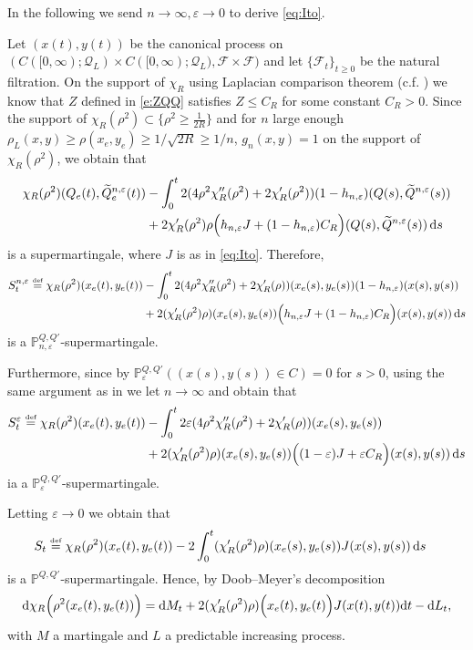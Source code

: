 \documentclass[11pt,UTF-8,reqno]{amsart}
\numberwithin{equation}{section}
\def\eps{\varepsilon}
\def\dif{{\mathord{{\rm d}}}}
\newcommand{\eqdef}{\stackrel{\mbox{\tiny def}}{=}}
\def\cQ{{\mathcal Q}}
\def\mP{{\mathbb P}}
\def\sF{{\mathscr F}}
\def\geq{\geqslant}
\def\leq{\leqslant}
\def\eps{\varepsilon}
\def\dif{{\mathord{{\rm d}}}}
\def\geq{\geqslant}
\def\leq{\leqslant}
\begin{document}
In the following we send $n\to\infty, \eps\to 0$ to derive \eqref{eq:Ito}.

Let $(x(t),y(t))$ be the canonical process on $(C([0,\infty);\cQ_L)\times C([0,\infty);\cQ_L),\sF\times \sF)$ and let $\{\sF_t\}_{t\geq0}$ be the natural filtration. On the support of $\chi_R$ using Laplacian comparison theorem (c.f. \cite[Corollary 3.4.4]{Hsu}) we know that $Z$ defined in  \eqref{e:ZQQ}  satisfies $Z\leq C_R$ for some constant $C_R>0$.
Since the support of $\chi_R(\rho^2)\subset \{\rho^2\geq \frac1{2R}\}$ and  for $n$ large enough  $\rho_L(x,y)\geq \rho(x_e,y_e) \geq 1/\sqrt{2R}\geq 1/n$, $g_n(x,y)=1$  on the support of $\chi_R(\rho^2)$, we obtain that
\begin{equation*}
	\aligned
	\chi_R(\rho^2)(Q_e(t),\widetilde{Q}^{n,\eps}_e(t))&-\int_0^t2(4\rho^2\chi_R''(\rho^2)+2\chi_R'(\rho^2))(1-h_{n,\eps})(Q(s),\widetilde{Q}^{n,\eps}(s))
	\\&+2\chi_R'(\rho^2)\rho\Big( h_{n,\eps}J+(1-h_{n,\eps})C_R\Big)(Q(s),\widetilde{Q}^{n,\eps}(s))\,\dif s
	\endaligned
\end{equation*}
is a supermartingale, where $J$ is as in \eqref{eq:Ito}. Therefore,
\begin{align*}
	S_t^{n,\eps}\eqdef	\chi_R(\rho^2)(x_e(t),y_e(t))&-\int_0^t2(4\rho^2\chi_R''(\rho^2)+2\chi_R'(\rho))(x_e(s),y_e(s))(1-h_{n,\eps})(x(s),y(s))
	\\&+2(\chi_R'(\rho^2)\rho)(x_e(s),y_e(s))\Big( h_{n,\eps}J+(1-h_{n,\eps})C_R\Big)(x(s),y(s)) \, \dif s
\end{align*}
is a $\mP_{n,\eps}^{Q,Q'}$-supermartingale.

Furthermore, since by \cite[Lemma~2.1.2]{Wang} $\mP_\eps^{Q,Q'}((x(s),y(s))\in C)=0$ for $s>0$,
using the same argument as in  \cite[Proof part (b) of Theorem 2.1.1]{Wang} we let $n\to\infty$ and obtain that
\begin{align*}
	S_t^\eps\eqdef \chi_R(\rho^2)(x_e(t),y_e(t))&-\int_0^t2\eps(4\rho^2\chi_R''(\rho^2)+2\chi_R'(\rho))(x_e(s),y_e(s))
	\\&+2(\chi_R'(\rho^2)\rho)(x_e(s),y_e(s))\Big( (1-\eps)J+\eps C_R\Big)(x(s),y(s))\,\dif s
\end{align*}
ia a $\mP_{\eps}^{Q,Q'}$-supermartingale.

Letting $\eps\to0$ we obtain that
\begin{align*}
	S_t\eqdef \chi_R(\rho^2)(x_e(t),y_e(t))&-2\int_0^t(\chi_R'(\rho^2)\rho)(x_e(s),y_e(s))J(x(s),y(s)) \, \dif s
\end{align*}
is a $\mP^{Q,Q'}$-supermartingale.
Hence, by Doob--Meyer's decomposition
\begin{align}\label{eq:a1}
	\dif \chi_R\Big(\rho^2(x_e(t),y_e(t))\Big)
	=\dif M_t
	+2(\chi_R'(\rho^2)\rho)
	\Big(x_e(t),y_e(t)\Big)J(x(t),y(t))\dif t
	-\dif L_t,
\end{align}
with $M$ a martingale and $L$ a predictable increasing process.
\end{document}
